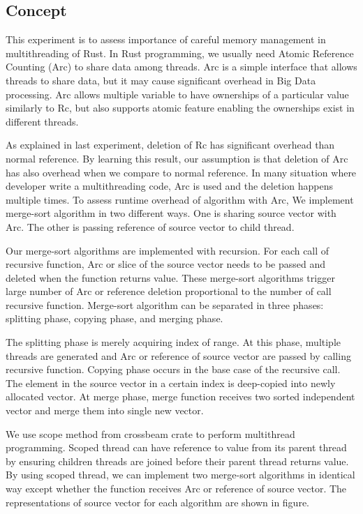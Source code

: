 \subsection{Concept}
This experiment is to assess importance of careful memory management in multithreading of Rust. 
In Rust programming, we usually need Atomic Reference Counting (Arc) to share data among threads. 
Arc is a simple interface that allows threads to share data, but it may cause significant overhead in Big Data processing.
Arc allows multiple variable to have ownerships of a particular value similarly to Rc, 
but also supports atomic feature enabling the ownerships exist in different threads. 

As explained in last experiment, deletion of Rc has significant overhead than normal reference. 
By learning this result, our assumption is that deletion of Arc has also overhead when we compare to normal reference. 
In many situation where developer write a multithreading code, Arc is used and the deletion happens multiple times. 
To assess runtime overhead of algorithm with Arc, We implement merge-sort algorithm in two different ways. 
One is sharing source vector with Arc. The other is passing reference of source vector to child thread. 

Our merge-sort algorithms are implemented with recursion. For each call of recursive function, 
Arc or slice of the source vector needs to be passed and deleted when the function returns value. 
These merge-sort algorithms trigger large number of Arc or reference deletion proportional to the number of call recursive function.
Merge-sort algorithm can be separated in three phases: splitting phase, copying phase, and merging phase. 

The splitting phase is merely acquiring index of range. At this phase, multiple threads are generated and Arc or reference of source vector are passed by calling recursive function. 
Copying phase occurs in the base case of the recursive call. The element in the source vector in a certain index is deep-copied into newly allocated vector.
At merge phase, merge function receives two sorted independent vector and merge them into single new vector.

We use scope method from crossbeam crate to perform multithread programming. 
Scoped thread can have reference to value from its parent thread by ensuring children threads are joined before their parent thread returns value. 
By using scoped thread, we can implement two merge-sort algorithms in identical way except whether the function receives Arc or reference of source vector.
The representations of source vector for each algorithm are shown in figure.

